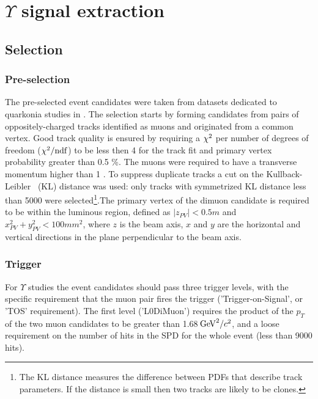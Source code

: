 \section{\texorpdfstring{$\Upsilon$}{Y} signal extraction}
\label{sec:upsilon}

\subsection{Selection}
\label{sec:ups:selelection}
\subsubsection{Pre-selection}
\label{sec:upsilon:selelection:preselection}
The pre-selected event candidates were taken from datasets dedicated to
quarkonia studies in \lhcb. The selection starts by forming candidates from
pairs of oppositely-charged tracks identified as muons and originated from a
common vertex. Good track quality is ensured by requiring a $\chi^2$ per number
of degrees of freedom ($\chi^2/\rm{ndf}$) to be less then 4 for the track fit
and primary vertex probability greater than 0.5 \%. The muons were required to
have a transverse momentum higher than 1 \gevc. To suppress duplicate tracks a
cut on the Kullback-Leibler~\cite{Needham:1082460} (KL) distance was used: only
tracks with symmetrized KL distance less than 5000 were selected\footnote{The
KL distance measures the difference between PDFs that describe track
parameters. If the distance is small then two tracks are likely to be
clones.}.The primary vertex of the dimuon candidate is required to be within the 
luminous region, defined as $|z_{PV}| < 0.5 m$ and $x_{PV}^2 + y_{PV}^2 < 100
mm^2$, where $z$ is the beam axis, $x$ and $y$ are the horizontal and vertical directions 
in the plane perpendicular to the beam axis.  
\subsubsection{Trigger}
\label{sec:upsilon:selection:trigger}

For $\Upsilon$ studies the event candidates should pass three
trigger levels, with the specific requirement that the muon pair fires the 
trigger ('Trigger-on-Signal', or 'TOS' requirement). The first level ('L0DiMuon') requires
the product of the $p_T$ of the two muon candidates to be greater than 1.68$\mathrm{\,Ge\kern -0.1em V}^2/c^2$, and
a loose requirement on the number of hits in the SPD for the whole event (less than 9000 hits).

